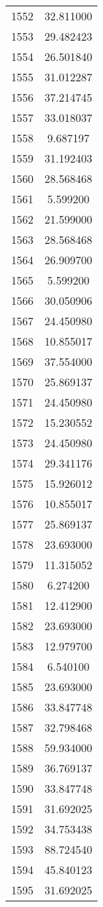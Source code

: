 \documentclass[12pt]{article}
\begin{document}
\begin{longtable}{@{}cc@{}}
1552 & 32.811000 \\
1553 & 29.482423 \\
1554 & 26.501840 \\
1555 & 31.012287 \\
1556 & 37.214745 \\
1557 & 33.018037 \\
1558 & 9.687197 \\
1559 & 31.192403 \\
1560 & 28.568468 \\
1561 & 5.599200 \\
1562 & 21.599000 \\
1563 & 28.568468 \\
1564 & 26.909700 \\
1565 & 5.599200 \\
1566 & 30.050906 \\
1567 & 24.450980 \\
1568 & 10.855017 \\
1569 & 37.554000 \\
1570 & 25.869137 \\
1571 & 24.450980 \\
1572 & 15.230552 \\
1573 & 24.450980 \\
1574 & 29.341176 \\
1575 & 15.926012 \\
1576 & 10.855017 \\
1577 & 25.869137 \\
1578 & 23.693000 \\
1579 & 11.315052 \\
1580 & 6.274200 \\
1581 & 12.412900 \\
1582 & 23.693000 \\
1583 & 12.979700 \\
1584 & 6.540100 \\
1585 & 23.693000 \\
1586 & 33.847748 \\
1587 & 32.798468 \\
1588 & 59.934000 \\
1589 & 36.769137 \\
1590 & 33.847748 \\
1591 & 31.692025 \\
1592 & 34.753438 \\
1593 & 88.724540 \\
1594 & 45.840123 \\
1595 & 31.692025 \\

\end{longtable}
\end{document}
